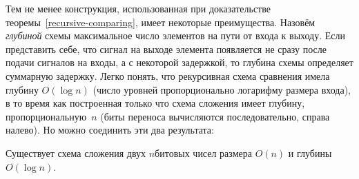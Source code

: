 Тем не менее конструкция, использованная при доказательстве
теоремы~\ref{recursive-comparing}, имеет некоторые
преимущества. Назовём \emph{глубиной}%
схемы максимальное число
элементов на пути от входа к выходу. Если представить себе, что
сигнал на выходе элемента появляется не сразу после подачи
сигналов на входы, а с некоторой задержкой, то глубина схемы
определяет суммарную задержку. Легко понять, что рекурсивная
схема сравнения имела глубину $O(\log n)$ (число уровней
пропорционально логарифму размера входа), в то время как
построенная только что схема сложения имеет глубину,
пропорциональную~$n$ (биты переноса вычисляются последовательно,
справа налево). Но можно соединить эти два результата:

\begin{theorem}
        \label{carry-save-adder}
Существует схема сложения двух $n$\д битовых чисел размера
$O(n)$ и глубины $O(\log n)$.
\end{theorem}

